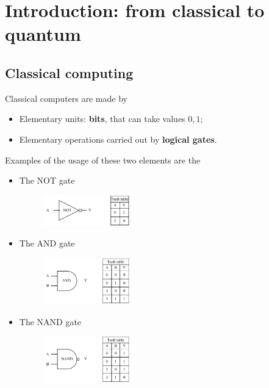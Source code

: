 \graphicspath{{chapters/01/}}
\chapter{Introduction: from classical to quantum}
\section{Classical computing}
Classical computers are made by 
\begin{itemize}
	\item Elementary units: \textbf{bits}, that can take values $0,1$;
	\item Elementary operations carried out by \textbf{logical gates}.
\end{itemize}
Examples of the usage of these two elements are the
\begin{itemize}
 \item The NOT gate 
	 \begin{figure}[H]
 		\centering
		\includegraphics[width=0.35\textwidth]{not.pdf}
	\end{figure}
 \item The AND gate
 	\begin{figure}[H]
 		\centering
		\includegraphics[width=0.35\textwidth]{and.pdf}
	\end{figure}
 \item The NAND gate
 	\begin{figure}[H]
 		\centering
		\includegraphics[width=0.35\textwidth]{nand.pdf}
	\end{figure}
\end{itemize}

